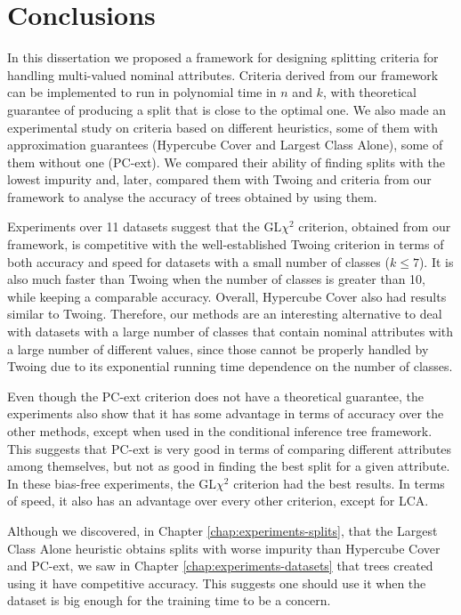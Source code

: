 \newpage

\chapter{Conclusions}
\label{chap:conclusions}

In this dissertation we proposed a framework for designing splitting criteria for handling multi-valued nominal attributes. Criteria derived from our framework can be implemented to run in polynomial time in $n$ and $k$, with theoretical guarantee of producing a split that is close to the optimal one. We also made an experimental study on criteria based on different heuristics, some of them with approximation guarantees (Hypercube Cover and Largest Class Alone), some of them without one (PC-ext). We compared their ability of finding splits with the lowest impurity and, later, compared them with Twoing and criteria from our framework to analyse the accuracy of trees obtained by using them.

Experiments over 11 datasets suggest that the GL$\chi^2$ criterion, obtained from our framework, is competitive with the well-established Twoing criterion in terms of both accuracy and speed for datasets with a small number of classes ($k \leq 7$). It is also much faster than Twoing when the number of classes is greater than 10, while keeping a comparable accuracy. Overall, Hypercube Cover also had results similar to Twoing. Therefore, our methods are an interesting alternative to deal with datasets with a large number of classes that contain nominal attributes with a large number of different values, since those cannot be properly handled by Twoing due to its exponential running time dependence on the number of classes.

Even though the PC-ext criterion does not have a theoretical guarantee, the experiments also show that it has some advantage in terms of accuracy over the other methods, except when used in the conditional inference tree framework. This suggests that PC-ext is very good in terms of comparing different attributes among themselves, but not as good in finding the best split for a given attribute. In these bias-free experiments, the GL$\chi^2$ criterion had the best results. In terms of speed, it also has an advantage over every other criterion, except for LCA.

Although we discovered, in Chapter \ref{chap:experiments-splits}, that the Largest Class Alone heuristic obtains splits with worse impurity than Hypercube Cover and PC-ext, we saw in Chapter \ref{chap:experiments-datasets} that trees created using it have competitive accuracy. This suggests one should use it when the dataset is big enough for the training time to be a concern.

